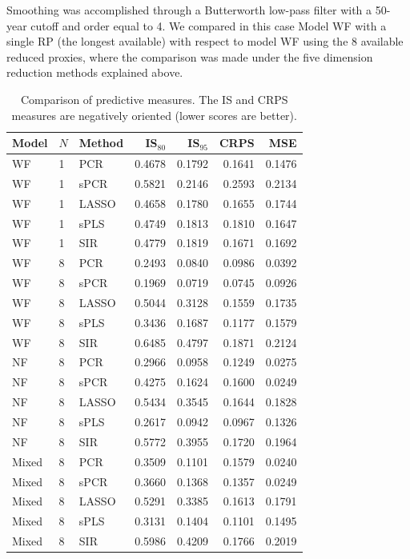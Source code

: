 \documentclass[12pt]{amsart}
\theoremstyle{plain}
\theoremstyle{definition}
\theoremstyle{remark}
\begin{document}
Smoothing was accomplished through a Butterworth low-pass filter with a 50-year cutoff and order equal to 4. We compared in this case Model WF with a single RP
(the longest available) with respect to model WF using the 8 available reduced
proxies, where the comparison was made under the five dimension reduction
methods explained above.
\begin{table}[h!]
  \centering
  {\small
\begin{tabular}{lll|rrr|r}
  \toprule
  \textbf{Model} & $N$ & \textbf{Method} & IS$_{80}$ & IS$_{95}$ & CRPS & MSE \\ 
  \midrule
  WF & 1 & PCR & 0.4678 & 0.1792 & 0.1641 & 0.1476 \\ 
  WF & 1 & sPCR & 0.5821 & 0.2146 & 0.2593 & 0.2134 \\ 
  WF & 1 & LASSO & 0.4658 & 0.1780 & 0.1655 & 0.1744 \\ 
  WF & 1 & sPLS & 0.4749 & 0.1813 & 0.1810 & 0.1647 \\ 
  WF & 1 & SIR & 0.4779 & 0.1819 & 0.1671 & 0.1692 \\
  \midrule
  WF & 8 & PCR & 0.2493 & 0.0840 & 0.0986 & 0.0392 \\ 
  WF & 8 & sPCR & 0.1969 & 0.0719 & 0.0745 & 0.0926 \\ 
  WF & 8 & LASSO & 0.5044 & 0.3128 & 0.1559 & 0.1735 \\ 
  WF & 8 & sPLS & 0.3436 & 0.1687 & 0.1177 & 0.1579 \\ 
  WF & 8 & SIR & 0.6485 & 0.4797 & 0.1871 & 0.2124 \\
  \midrule
  NF & 8 & PCR & 0.2966 & 0.0958 & 0.1249 & 0.0275 \\ 
  NF & 8 & sPCR & 0.4275 & 0.1624 & 0.1600 & 0.0249 \\ 
  NF & 8 & LASSO & 0.5434 & 0.3545 & 0.1644 & 0.1828 \\ 
  NF & 8 & sPLS & 0.2617 & 0.0942 & 0.0967 & 0.1326 \\ 
  NF & 8 & SIR & 0.5772 & 0.3955 & 0.1720 & 0.1964 \\
  \midrule
  Mixed & 8 & PCR & 0.3509 & 0.1101 & 0.1579 & 0.0240 \\ 
  Mixed & 8 & sPCR & 0.3660 & 0.1368 & 0.1357 & 0.0249 \\ 
  Mixed & 8 & LASSO & 0.5291 & 0.3385 & 0.1613 & 0.1791 \\ 
  Mixed & 8 & sPLS & 0.3131 & 0.1404 & 0.1101 & 0.1495 \\ 
  Mixed & 8 & SIR & 0.5986 & 0.4209 & 0.1766 & 0.2019 \\ 
   \bottomrule
\end{tabular}
}
\caption{Comparison of predictive measures. The IS and CRPS measures are
  negatively oriented (lower scores are better).}
\label{tab:comparisontot}
\end{table}
\end{document}
